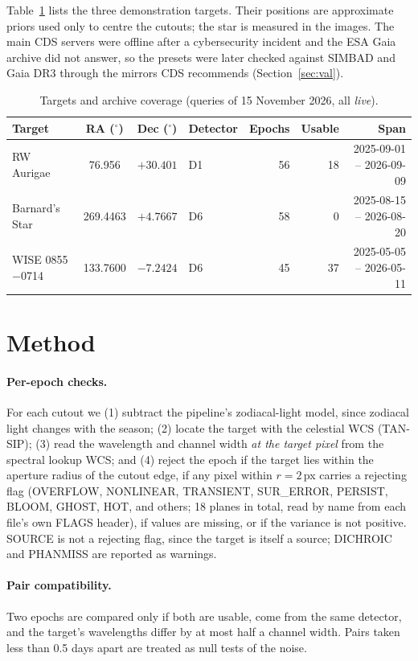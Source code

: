 \documentclass[11pt,a4paper]{article}
\begin{document}
Table~\ref{tab:targets} lists the three demonstration targets. Their positions are approximate priors used only to
centre the cutouts; the star is measured in the images. The main CDS servers were offline after a cybersecurity
incident \parencite{cds_incident2026} and the ESA Gaia archive did not answer, so the presets were later checked against
SIMBAD \parencite{simbad2000} and Gaia DR3 \parencite{gaiadr3} through the mirrors CDS recommends (Section~\ref{sec:val}).

\begin{table}[h]\centering\small
\caption{Targets and archive coverage (queries of 15 November 2026, all \emph{live}).}\label{tab:targets}
\begin{tabular}{lcclrrr}\toprule
Target & RA ($^\circ$) & Dec ($^\circ$) & Detector & Epochs & Usable & Span \\\midrule
RW Aurigae & 76.956 & $+30.401$ & D1 & 56 & 18 & 2025-09-01 -- 2026-09-09\\
Barnard's Star & 269.4463 & $+4.7667$ & D6 & 58 & 0 & 2025-08-15 -- 2026-08-20\\
WISE 0855$-$0714 & 133.7600 & $-7.2424$ & D6 & 45 & 37 & 2025-05-05 -- 2026-05-11\\\bottomrule
\end{tabular}
\end{table}

\section{Method}\label{sec:method}
\paragraph{Per-epoch checks.} For each cutout we (1) subtract the pipeline's zodiacal-light model, since zodiacal
light changes with the season; (2) locate the target with the celestial WCS (TAN-SIP); (3) read the wavelength and
channel width \emph{at the target pixel} from the spectral lookup WCS; and (4) reject the epoch if the target lies
within the aperture radius of the cutout edge, if any pixel within $r=2$\,px carries a rejecting flag (OVERFLOW,
NONLINEAR, TRANSIENT, SUR\_ERROR, PERSIST, BLOOM, GHOST, HOT, and others; 18 planes in total, read by name from each
file's own FLAGS header), if values are missing, or if the variance is not positive. SOURCE is not a rejecting flag,
since the target is itself a source; DICHROIC and PHANMISS are reported as warnings.

\paragraph{Pair compatibility.} Two epochs are compared only if both are usable, come from the same detector, and
the target's wavelengths differ by at most half a channel width. Pairs taken less than 0.5 days apart are treated as
null tests of the noise.
\end{document}
